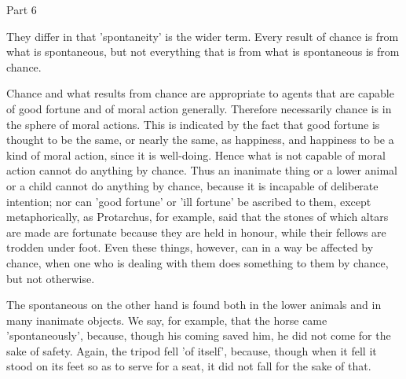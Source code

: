 Part 6

They differ in that 'spontaneity' is the wider term. Every result
of chance is from what is spontaneous, but not everything that is
from what is spontaneous is from chance. 

Chance and what results from chance are appropriate to agents that
are capable of good fortune and of moral action generally. Therefore
necessarily chance is in the sphere of moral actions. This is indicated
by the fact that good fortune is thought to be the same, or nearly
the same, as happiness, and happiness to be a kind of moral action,
since it is well-doing. Hence what is not capable of moral action
cannot do anything by chance. Thus an inanimate thing or a lower animal
or a child cannot do anything by chance, because it is incapable of
deliberate intention; nor can 'good fortune' or 'ill fortune' be ascribed
to them, except metaphorically, as Protarchus, for example, said that
the stones of which altars are made are fortunate because they are
held in honour, while their fellows are trodden under foot. Even these
things, however, can in a way be affected by chance, when one who
is dealing with them does something to them by chance, but not otherwise.

The spontaneous on the other hand is found both in the lower animals
and in many inanimate objects. We say, for example, that the horse
came 'spontaneously', because, though his coming saved him, he did
not come for the sake of safety. Again, the tripod fell 'of itself',
because, though when it fell it stood on its feet so as to serve for
a seat, it did not fall for the sake of that. 

